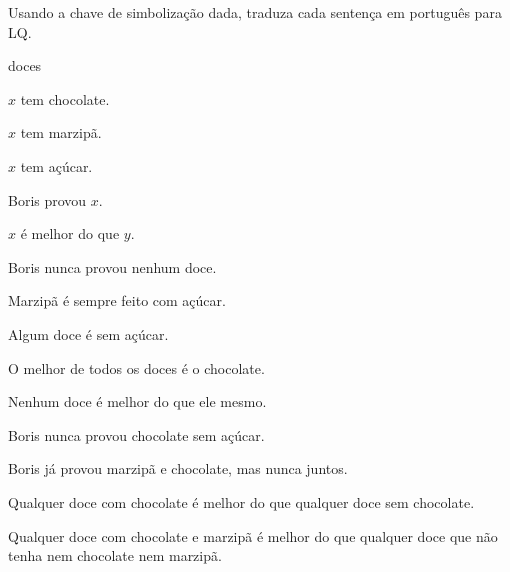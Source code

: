 \solutions
\problempart
\label{pr.QLcandies}
Usando a chave de simbolização dada, traduza cada sentença em português para LQ.
\begin{ekey}
\item[UD:] doces
\item[Cx:] $x$ tem chocolate.
\item[Mx:] $x$ tem marzipã.
\item[Sx:] $x$ tem açúcar.
\item[Tx:] Boris provou $x$.
\item[Bxy:] $x$ é melhor do que $y$.
\end{ekey}
\begin{earg}
\item Boris nunca provou nenhum doce.
\item Marzipã é sempre feito com açúcar.
\item Algum doce é sem açúcar.
\item O melhor de todos os doces é o chocolate.
\item Nenhum doce é melhor do que ele mesmo.
\item Boris nunca provou chocolate sem açúcar.
\item Boris já provou marzipã e chocolate, mas nunca juntos.
\item Qualquer doce com chocolate é melhor do que qualquer doce sem chocolate.
\item Qualquer doce com chocolate e marzipã é melhor do que qualquer doce que não tenha nem chocolate nem marzipã.
\end{earg}



